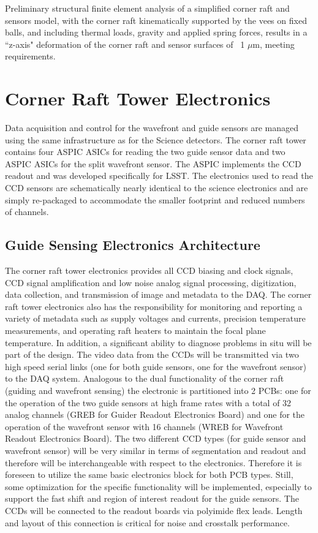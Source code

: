 Preliminary structural finite element analysis of a simplified corner raft and sensors model, with the
corner raft kinematically supported by the vees on fixed balls, and including thermal loads, gravity and
applied spring forces, results in a ``z-axis" deformation of the corner raft and sensor surfaces of ~1 $\mu$m,
meeting requirements.

\section{Corner Raft Tower Electronics}

Data acquisition and control for the wavefront and guide sensors are managed using the same
infrastructure as for the Science detectors. The corner raft tower contains four ASPIC ASICs for reading
the two guide sensor data and two ASPIC ASICs for the split wavefront sensor. The ASPIC implements
the CCD readout and was developed specifically for LSST. The electronics used to read the CCD sensors
are schematically nearly identical to the science electronics and are simply re-packaged to
accommodate the smaller footprint and reduced numbers of channels.

\subsection{Guide Sensing Electronics Architecture}

The corner raft tower electronics provides all CCD biasing and clock signals, CCD signal amplification and
low noise analog signal processing, digitization, data collection, and transmission of image and metadata
to the DAQ. The corner raft tower electronics also has the responsibility for monitoring and reporting a
variety of metadata such as supply voltages and currents, precision temperature measurements, and
operating raft heaters to maintain the focal plane temperature. In addition, a significant ability to
diagnose problems in situ will be part of the design. The video data from the CCDs will be transmitted
via two high speed serial links (one for both guide sensors, one for the wavefront sensor) to the DAQ
system. Analogous to the dual functionality of the corner raft (guiding and wavefront sensing) the
electronic is partitioned into 2 PCBs: one for the operation of the two guide sensors at high frame rates
with a total of 32 analog channels (GREB for Guider Readout Electronics Board) and one for the
operation of the wavefront sensor with 16 channels (WREB for Wavefront Readout Electronics Board).
The two different CCD types (for guide sensor and wavefront sensor) will be very similar in terms of
segmentation and readout and therefore will be interchangeable with respect to the electronics.
Therefore it is foreseen to utilize the same basic electronics block for both PCB types. Still, some
optimization for the specific functionality will be implemented, especially to support the fast shift and
region of interest readout for the guide sensors. The CCDs will be connected to the readout boards via
polyimide flex leads. Length and layout of this connection is critical for noise and crosstalk performance.

